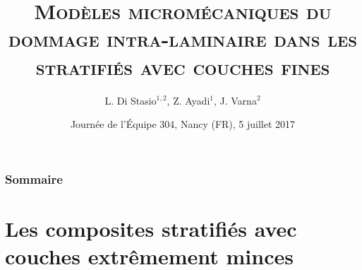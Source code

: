 \documentclass[first,firstsupp,lastsupp,handout,last,hyperref,table]{ETHclass}
\makeatletter
\newenvironment{withoutheadline}{
         \setbeamertemplate{headline}{%
\vspace{35pt}
}
    }{}
\makeatother
\begin{document}

\title[\textsc{Mod\`eles microm\'caniques du dommage intra-laminaire}]{\textsc{Mod\`eles microm\'ecaniques du dommage intra-laminaire dans les stratifi\'es avec couches fines}}
\author{ L. Di Stasio$^{1,2}$, Z. Ayadi$^{1}$, J. Varna$^{2}$}
\date{Journ\'ee de l'\'Equipe 304, Nancy (FR), 5 juillet 2017}

\begin{frame}[plain]
    \titlepage
\end{frame}

\begin{withoutheadline}
\begin{frame}
\frametitle{Sommaire}
\justifying
\vspace*{-0.5cm}
\tableofcontents[hidesubsections]
\end{frame}
\end{withoutheadline}



\section[Les stratifi\'es avec couches minces]{Les composites stratifi\'es avec couches extr\^emement minces}
\end{document}
